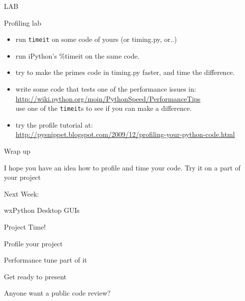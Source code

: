 \documentclass{beamer}
\begin{document}
\begin{frame}[fragile]{LAB}

{\Large Profiling lab}
\begin{itemize}
  \item run \verb|timeit| on some code of yours (or timing.py, or..)
  \item run iPython's \%timeit on the same code.
  \item try to make the primes code in timing.py faster, and time the difference.
  \item write some code that tests one of the performance issues in:\\
        {\small \url{http://wiki.python.org/moin/PythonSpeed/PerformanceTips} }\\
        use one of the \verb|timeit|s to see if you can make a difference.
  \item try the profile tutorial at:\\
        {\small \url{http://pysnippet.blogspot.com/2009/12/profiling-your-python-code.html} }
\end{itemize}

\end{frame}


\begin{frame}[fragile]{Wrap up}

\vfill
{\Large I hope you have an idea how to profile and time your code.}
\vfill
{\Large Try it on a part of your project}
\vfill

\end{frame}

\begin{frame}{Next Week:}

\vfill
{\LARGE wxPython Desktop GUIs}

\vfill

\end{frame}

\begin{frame}[fragile]{Project Time!}

\vfill
\Large{Profile your project}

\vfill
\Large{Performance tune part of it}

\vfill
\Large{Get ready to present}

\vfill
\Large{Anyone want a public code review?}

\end{frame}
\end{document}
